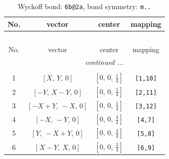 \documentclass[fleqn,8pt]{jsarticle}
\begin{document}
\begin{longtable}{cccc}
\caption{Wyckoff bond: {\tt 6b@2a}, bond symmetry: {\tt m..}}
 \\
 \hline \hline
No. & vector & center & mapping \\ \hline \endfirsthead

\multicolumn{3}{l}{\tablename\ \thetable{}} \\
 \hline \hline
No. & vector & center & mapping \\ \hline \endhead

 \hline \hline
\multicolumn{3}{r}{\footnotesize\it continued ...} \\ \endfoot

 \hline \hline
\multicolumn{3}{r}{} \\ \endlastfoot

1 & $\left[ X,\, Y,\, 0 \right]$ & $\left[ 0,\, 0,\, \frac{1}{4} \right]$ & {\tt [1,10]} \\ \hline
2 & $\left[ - Y,\, X - Y,\, 0 \right]$ & $\left[ 0,\, 0,\, \frac{1}{4} \right]$ & {\tt [2,11]} \\ \hline
3 & $\left[ - X + Y,\, - X,\, 0 \right]$ & $\left[ 0,\, 0,\, \frac{1}{4} \right]$ & {\tt [3,12]} \\ \hline
4 & $\left[ - X,\, - Y,\, 0 \right]$ & $\left[ 0,\, 0,\, \frac{3}{4} \right]$ & {\tt [4,7]} \\ \hline
5 & $\left[ Y,\, - X + Y,\, 0 \right]$ & $\left[ 0,\, 0,\, \frac{3}{4} \right]$ & {\tt [5,8]} \\ \hline
6 & $\left[ X - Y,\, X,\, 0 \right]$ & $\left[ 0,\, 0,\, \frac{3}{4} \right]$ & {\tt [6,9]} \\
\end{longtable}
\renewcommand{\arraystretch}{1.2}
\end{document}
